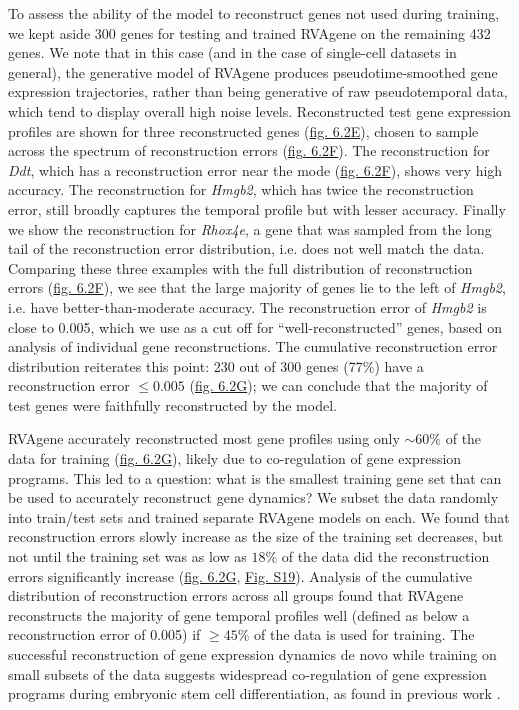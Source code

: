 {
To assess the ability of the model to reconstruct genes not used during training, we kept aside 300 genes for testing and trained RVAgene on the remaining 432 genes.
We note that in this case (and in the case of single-cell datasets in general), the generative model of RVAgene produces pseudotime-smoothed gene expression trajectories, rather than being generative of raw pseudotemporal data, which tend to display overall high noise levels.
}
Reconstructed test gene expression profiles are shown for three reconstructed genes
(\hyperref[fig:fig3]{fig. 6.2E}), chosen to sample across the spectrum of reconstruction errors
(\hyperref[fig:fig3]{fig. 6.2F}). The reconstruction for {\em Ddt}, which has a reconstruction error
near the mode (\hyperref[fig:fig3]{fig. 6.2F}), shows very high accuracy. The reconstruction for
{\em Hmgb2}, which has twice the reconstruction error, still broadly captures the temporal profile
but with lesser accuracy. Finally we show the reconstruction for {\em Rhox4e}, a gene that was
sampled from the long tail of the reconstruction error distribution, i.e. does not well match the
data. Comparing these three examples with the full distribution of reconstruction errors
(\hyperref[fig:fig3]{fig. 6.2F}), we see that the large majority of genes lie to the left of {\em
Hmgb2}, i.e. have better-than-moderate accuracy. The reconstruction error of {\em Hmgb2} is close to
0.005, which we use as a cut off for ``well-reconstructed'' genes, based on analysis of individual
gene reconstructions. The cumulative reconstruction error distribution reiterates this point: 230
out of 300 genes (77\%) have a reconstruction error $\leq 0.005$ (\hyperref[fig:fig3]{fig. 6.2G}); we can conclude that the majority of test genes were faithfully reconstructed by the model.
\par
RVAgene accurately reconstructed most gene profiles using only $\sim60 {\%}$ of the data for
training (\hyperref[fig:fig3]{fig. 6.2G}), likely due to co-regulation of gene expression programs.
This led to a question: what is the smallest training gene set that can be used to accurately
reconstruct gene dynamics? We subset the data randomly into train/test sets and trained separate
RVAgene models on each. We found that reconstruction errors slowly increase as the size of the
training set decreases, but not until the training set was as low as $18\%$ of the data did the
reconstruction errors significantly increase (\hyperref[fig:fig3]{fig. 6.2G}, \hyperref[fig:figS4]{Fig. S19}). Analysis of the cumulative distribution of reconstruction errors across all groups found that RVAgene reconstructs the majority of gene temporal profiles well (defined as below a reconstruction error of 0.005) if $\geq 45\%$ of the data is used for training. The successful reconstruction of gene expression dynamics de novo while training on  small subsets of the data suggests widespread co-regulation of gene expression programs during embryonic stem cell differentiation, as found in previous work \citep{jang2017dynamics}.

